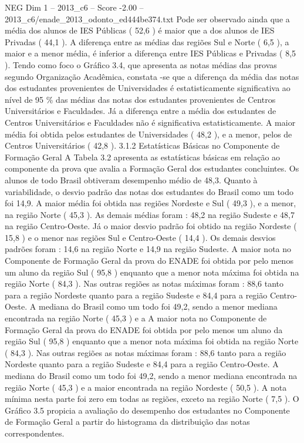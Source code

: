 \begin{textsample}{NEG Dim 1 – 2013\_c6 – Score -2.00 – 2013\_c6/enade\_2013\_odonto\_ed444be374.txt}
Pode ser observado ainda que a média dos alunos de IES Públicas ( 52,6 ) é maior que a dos alunos de IES Privadas ( 44,1 ).
A diferença entre as médias das regiões Sul e Norte ( 6,5 ), a maior e a menor média, é inferior a diferença entre IES Públicas e Privadas ( 8,5 ).
Tendo como foco o Gráfico 3.4, que apresenta as notas médias das provas segundo Organização Acadêmica, constata -se que a diferença da média das notas dos estudantes provenientes de Universidades é estatisticamente significativa ao nível de 95 \% das médias das notas dos estudantes provenientes de Centros Universitários e Faculdades.
Já a diferença entre a média dos estudantes de Centros Universitários e Faculdades não é significativa estatisticamente.
A maior média foi obtida pelos estudantes de Universidades ( 48,2 ), e a menor, pelos de Centros Universitários ( 42,8 ). 3.1.2 Estatísticas Básicas no Componente de Formação Geral A Tabela 3.2 apresenta as estatísticas básicas em relação ao componente da prova que avalia a Formação Geral dos estudantes concluintes.
Os alunos de todo Brasil obtiveram desempenho médio de 48,3.
Quanto à variabilidade, o desvio padrão das notas dos estudantes do Brasil como um todo foi 14,9.
A maior média foi obtida nas regiões Nordeste e Sul ( 49,3 ), e a menor, na região Norte ( 45,3 ).
As demais médias foram : 48,2 na região Sudeste e 48,7 na região Centro-Oeste.
Já o maior desvio padrão foi obtido na região Nordeste ( 15,8 ) e o menor nas regiões Sul e Centro-Oeste ( 14,4 ).
Os demais desvios padrões foram : 14,6 na região Norte e 14,9 na região Sudeste.
A maior nota no Componente de Formação Geral da prova do ENADE foi obtida por pelo menos um aluno da região Sul ( 95,8 ) enquanto que a menor nota máxima foi obtida na região Norte ( 84,3 ).
Nas outras regiões as notas máximas foram : 88,6 tanto para a região Nordeste quanto para a região Sudeste e 84,4 para a região Centro-Oeste.
A mediana do Brasil como um todo foi 49,2, sendo a menor mediana encontrada na região Norte ( 45,3 ) e a A maior nota no Componente de Formação Geral da prova do ENADE foi obtida por pelo menos um aluno da região Sul ( 95,8 ) enquanto que a menor nota máxima foi obtida na região Norte ( 84,3 ).
Nas outras regiões as notas máximas foram : 88,6 tanto para a região Nordeste quanto para a região Sudeste e 84,4 para a região Centro-Oeste.
A mediana do Brasil como um todo foi 49,2, sendo a menor mediana encontrada na região Norte ( 45,3 ) e a maior encontrada na região Nordeste ( 50,5 ).
A nota mínima nesta parte foi zero em todas as regiões, exceto na região Norte ( 7,5 ).
O Gráfico 3.5 propicia a avaliação do desempenho dos estudantes no Componente de Formação Geral a partir do histograma da distribuição das notas correspondentes.

\end{textsample}
